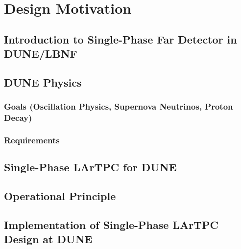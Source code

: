 \chapter{Design Motivation}
\label{ch:fdsp-apa-design}

\section{Introduction to Single-Phase Far Detector in DUNE/LBNF}
\label{sec:fdsp-design-intro}



\section{DUNE Physics}
\label{sec:fdsp-design-phys}

\subsection{Goals (Oscillation Physics, Supernova Neutrinos, Proton Decay)}
\label{sec:fdsp-design-goals}

\subsection{Requirements}
\label{sec:fdsp-design-reqs}



\section{Single-Phase LArTPC for DUNE}
\label{sec:fdsp-design-tpc}

\section{Operational Principle}
\label{sec:fdsp-design-op}

\section{Implementation of Single-Phase LArTPC Design at DUNE}
\label{sec:fdsp-design-impl}

 